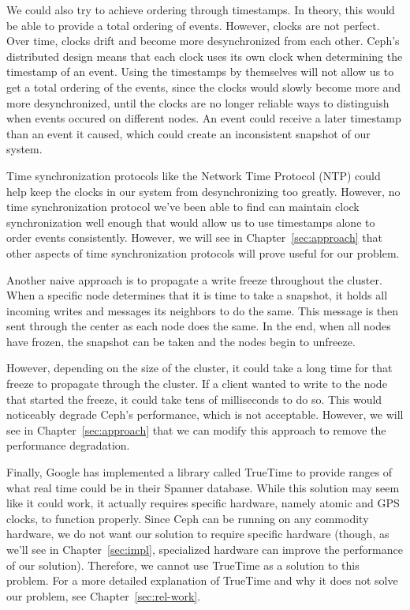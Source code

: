 We could also try to achieve ordering through timestamps. In theory,
this would be able to provide a total ordering of events. However, clocks are not perfect. Over time, clocks drift and become more desynchronized from each other. Ceph's distributed design means that each clock uses its own clock
when determining the timestamp of an event. Using the timestamps by themselves
will not allow us to get a total ordering of the events, since the clocks
would slowly become more and more desynchronized, until the clocks are no 
longer reliable ways to distinguish when events occured on different nodes. An 
event could receive a later timestamp than an event it caused, which could 
create an inconsistent snapshot of our system. 

Time synchronization protocols like the Network Time Protocol (NTP) could help
keep the clocks in our system from desynchronizing too greatly. However, no
time synchronization protocol we've been able to find can maintain 
clock synchronization well enough that would allow us to use timestamps alone
to order events consistently. However, we will see in Chapter~\ref{sec:approach} that other aspects of time synchronization protocols will prove useful
for our problem.

Another naive approach is to propagate a write freeze throughout the cluster. 
When a specific node determines that it is time to take a snapshot, it holds 
all incoming writes and messages its neighbors to do the same. This message 
is then sent through the center as each node does the same. In the end, when 
all nodes have frozen, the snapshot can be taken and the nodes begin to 
unfreeze. 

However, depending on the size of the cluster, it could take a long time for 
that freeze to propagate through the cluster. If a client wanted to write to  
the node that started the freeze, it could take tens of milliseconds to do so. 
This would noticeably degrade Ceph's performance, which is not acceptable. 
However, we will see in Chapter~\ref{sec:approach} that we can modify this 
approach to remove the performance degradation.

Finally, Google has implemented a library called TrueTime to provide ranges of 
what real time could be in their Spanner database. While this solution may seem like
it could work, it actually requires specific hardware, namely atomic and GPS
clocks, to function properly. Since Ceph can be running on any commodity hardware, we do
not want our solution to require specific hardware (though, as we'll see in 
Chapter~\ref{sec:impl}, specialized hardware can improve the performance of
our solution). Therefore, we cannot use TrueTime as a solution to this 
problem. For a more detailed explanation of TrueTime and why it does not solve 
our problem, see Chapter~\ref{sec:rel-work}.















